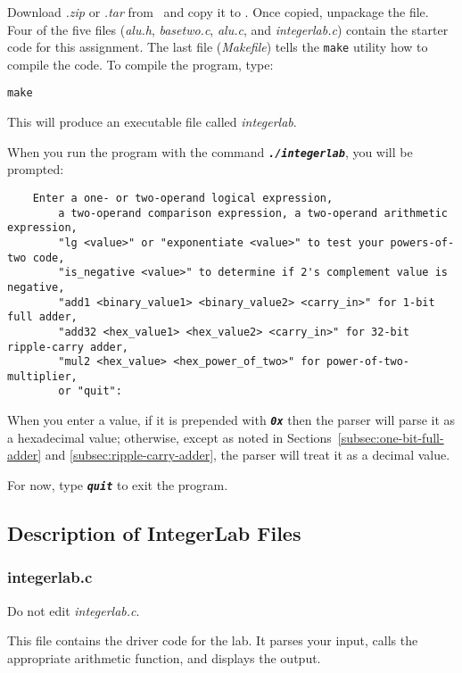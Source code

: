 Download \textit{\shortlabname.zip} or \textit{\shortlabname.tar} from \filesource\ and copy it to \runtimeenvironment.
Once copied, unpackage the file.
Four of the five files (\textit{alu.h}, \textit{basetwo.c}, \textit{alu.c}, and \textit{integerlab.c}) contain the starter code for this assignment.
The last file (\textit{Makefile}) tells the \texttt{make} utility how to compile the code.
To compile the program, type:

\texttt{make}

This will produce an executable file called \textit{integerlab}.

When you run the program with the command \texttt{\textbf{\textit{./integerlab}}}, you will be prompted:

\begin{verbatim}
    Enter a one- or two-operand logical expression,
        a two-operand comparison expression, a two-operand arithmetic expression,
        "lg <value>" or "exponentiate <value>" to test your powers-of-two code,
        "is_negative <value>" to determine if 2's complement value is negative,
        "add1 <binary_value1> <binary_value2> <carry_in>" for 1-bit full adder,
        "add32 <hex_value1> <hex_value2> <carry_in>" for 32-bit ripple-carry adder,
        "mul2 <hex_value> <hex_power_of_two>" for power-of-two-multiplier,
        or "quit":
\end{verbatim}

When you enter a value, if it is prepended with \texttt{\textbf{\textit{0x}}} then the parser will parse it as a hexadecimal value;
otherwise, except as noted in Sections~\ref{subsec:one-bit-full-adder} and \ref{subsec:ripple-carry-adder}, the parser will treat it as a decimal value.

For now, type \texttt{\textbf{\textit{quit}}} to exit the program.

\subsection{Description of IntegerLab Files}

\subsubsection{integerlab.c}

Do not edit \textit{integerlab.c}.

This file contains the driver code for the lab.
It parses your input, calls the appropriate arithmetic function, and displays the output.

